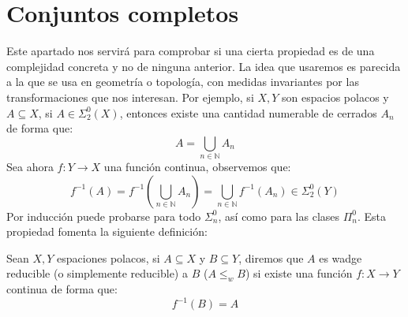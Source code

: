 
\section{Conjuntos completos}
Este apartado nos servirá para comprobar si una cierta propiedad es de una complejidad concreta y no de ninguna anterior. La idea que usaremos es parecida a la que se usa en geometría o topología, con medidas invariantes por las transformaciones que nos interesan. Por ejemplo, si $X,Y$ son espacios polacos y $A\subseteq X$, si $A\in \Sigma^0_2(X)$, entonces existe una cantidad numerable de cerrados $A_n$ de forma que:
\begin{equation*}
    A = \bigcup_{n\in \mathbb{N}} A_n
\end{equation*}
Sea ahora $f:Y\to X$ una función continua, observemos que:
\begin{equation*}
    f^{-1}(A) = f^{-1}\left(\bigcup_{n\in \mathbb{N}}A_n\right) = \bigcup_{n\in \mathbb{N}}f^{-1}(A_n) \in \Sigma^0_2(Y)
\end{equation*}
Por inducción puede probarse para todo $\Sigma^0_n$, así como para las clases $\Pi^0_n$.
Esta propiedad fomenta la siguiente definición:
\begin{definicion}
    Sean $X,Y$ espaciones polacos, si $A\subseteq X$ y $B\subseteq Y$, diremos que $A$ es wadge reducible (o simplemente reducible) a $B$ ($A\leq_{w}B$) si existe una función $f:X\to Y$ continua de forma que:
    \begin{equation*}
        f^{-1}(B) = A
    \end{equation*}
\end{definicion}

